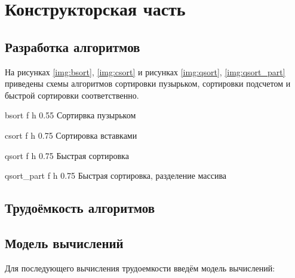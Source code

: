\chapter{Конструкторская часть}

\section{Разработка алгоритмов}

На рисунках \ref{img:bsort}, \ref{img:csort} и рисунках \ref{img:qsort}, \ref{img:qsort_part} приведены схемы алгоритмов сортировки пузырьком,
сортировки подсчетом и быстрой сортировки соответственно.

{bsort} %
{f} %
{h} %
{0.55\textwidth} %
{Сортирвка пузырьком} %
\clearpage

{csort} %
{f} %
{h} %
{0.75\textwidth} %
{Сортировка вставками} %
\clearpage

{qsort} %
{f} %
{h} %
{0.75\textwidth} %
{Быстрая сортировка} %
\clearpage

{qsort_part} %
{f} %
{h} %
{0.75\textwidth} %
{Быстрая сортировка, разделение массива} %
\clearpage


\section{Трудоёмкость алгоритмов}

\section{Модель вычислений}

Для последующего вычисления трудоемкости введём модель вычислений:

